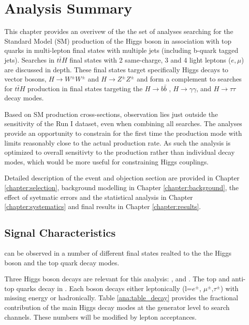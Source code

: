 \chapter[\tth Analysis Summary][\tth Analysis Summary]{\tth Analysis Summary}
\label{chapter:analysis} 
This chapter provides an overivew of the the set of analyses searching for the Standard Model
(SM) production of the Higgs boson in association with top quarks in
multi-lepton final states with multiple jets (including b-quark tagged jets).
Searches in $t\bar{t}H$ final states with 2 same-charge, 3 and 4 light leptons
($e, \mu$) are discussed in depth. These final states target specifically Higgs
decays to vector bosons, $H\rightarrow W^{\pm}W^{\pm}$ and $H\rightarrow
Z^{\pm}Z^{\pm}$ and form a complement to searches for $t\bar{t}H$ production in
final states targeting the $H\rightarrow b\bar{b}$ \cite{Aad:2014lma},
      $H\rightarrow\gamma\gamma$\cite{ATLAS-CONF-2014-011}, and $H\rightarrow\tau\tau$ decay modes.


Based on SM production cross-sections, observation lies just outside the sensitivity
of the Run I dataset, even when combining all searches. The analyses provide an opportunity to 
constrain for the first time the \tth production mode with limits reasonably close to the
actual production rate. As such the analysis is optimized to overall sensitivty to the 
\tth production rather than individual decay modes, which would be more useful for
constraining Higgs couplings. 


Detailed description of the event and objection section are provided in Chapter \ref{chapter:selection},
background modelling in Chapter \ref{chapter:background}, the effect of syetmatic errors and the 
statistical analysis in Chapter \ref{chapter:systematics} and final results in Chapter \ref{chapter:results}.


\section{Signal Characteristics} 
\tth can be observed in a number of different final states realted to the
the Higgs boson and the top quark decay modes.

Three Higgs boson decays are relevant for this analysis: \WW,
\twotau and \ZZ. The top and anti-top quarks decay  in
\Wb. Each \W boson decays either 
leptonically (l=$e^\pm$, $\mu^\pm$,$\tau^\pm$) with missing energy or hadronically. 
Table \ref{ana:table_decay} provides the fractional contribution of the main 
Higgs decay modes at the generator level to \tth search channels. These
numbers will be modified by lepton acceptances. 

